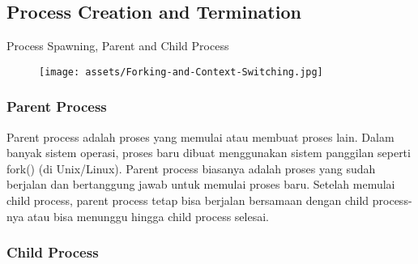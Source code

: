 \documentclass[12pt]{article}
\begin{document}
\subsection{Process Creation and Termination} 
Process Spawning, Parent and Child Process
\begin{figure} [h]
        \centering
        \texttt{[image: assets/Forking-and-Context-Switching.jpg]}
        \label{fig:diagram}
\end{figure}
\subsubsection {Parent Process}
    {Parent process} adalah proses yang memulai atau membuat proses lain. Dalam banyak sistem operasi, proses baru dibuat menggunakan sistem panggilan seperti fork() (di Unix/Linux). Parent process biasanya adalah proses yang sudah berjalan dan bertanggung jawab untuk memulai proses baru.
    Setelah memulai child process, parent process tetap bisa berjalan bersamaan dengan child process-nya atau bisa menunggu hingga child process selesai.

\subsubsection {Child Process}
\end{document}
